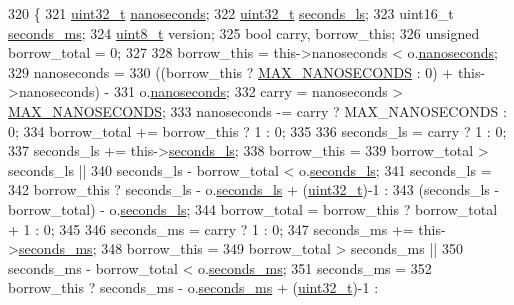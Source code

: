 \begin{DoxyCode}
320                                               \{
321         \hyperlink{parse_8c_a6eb1e68cc391dd753bc8ce896dbb8315}{uint32\_t} \hyperlink{class_timestamp_a78ae11d98fcfe738239d0a853d82c84a}{nanoseconds};
322         \hyperlink{parse_8c_a6eb1e68cc391dd753bc8ce896dbb8315}{uint32\_t} \hyperlink{class_timestamp_a2bf200e58cd268d8b86cf93c51500a44}{seconds\_ls};
323         uint16\_t \hyperlink{class_timestamp_a5d98378d782519e6f9c17db70f1620f0}{seconds\_ms};
324         \hyperlink{stdint_8h_aba7bc1797add20fe3efdf37ced1182c5}{uint8\_t} version;
325         \textcolor{keywordtype}{bool} carry, borrow\_this;
326         \textcolor{keywordtype}{unsigned} borrow\_total = 0;
327 
328         borrow\_this = this->nanoseconds < o.\hyperlink{class_timestamp_a78ae11d98fcfe738239d0a853d82c84a}{nanoseconds};
329         nanoseconds =
330             ((borrow\_this ? \hyperlink{ieee1588_8hpp_ad461a8bebfaea4b50a4e8cc7f73be797}{MAX\_NANOSECONDS} : 0) + this->nanoseconds) -
331             o.\hyperlink{class_timestamp_a78ae11d98fcfe738239d0a853d82c84a}{nanoseconds};
332         carry = nanoseconds > \hyperlink{ieee1588_8hpp_ad461a8bebfaea4b50a4e8cc7f73be797}{MAX\_NANOSECONDS};
333         nanoseconds -= carry ? MAX\_NANOSECONDS : 0;
334         borrow\_total += borrow\_this ? 1 : 0;
335 
336         seconds\_ls  = carry ? 1 : 0;
337         seconds\_ls += this->\hyperlink{class_timestamp_a2bf200e58cd268d8b86cf93c51500a44}{seconds\_ls};
338         borrow\_this =
339             borrow\_total > seconds\_ls ||
340             seconds\_ls - borrow\_total < o.\hyperlink{class_timestamp_a2bf200e58cd268d8b86cf93c51500a44}{seconds\_ls};
341         seconds\_ls  =
342             borrow\_this ? seconds\_ls - o.\hyperlink{class_timestamp_a2bf200e58cd268d8b86cf93c51500a44}{seconds\_ls} + (\hyperlink{parse_8c_a6eb1e68cc391dd753bc8ce896dbb8315}{uint32\_t})-1 :
343             (seconds\_ls - borrow\_total) - o.\hyperlink{class_timestamp_a2bf200e58cd268d8b86cf93c51500a44}{seconds\_ls};
344         borrow\_total = borrow\_this ? borrow\_total + 1 : 0;
345 
346         seconds\_ms  = carry ? 1 : 0;
347         seconds\_ms += this->\hyperlink{class_timestamp_a5d98378d782519e6f9c17db70f1620f0}{seconds\_ms};
348         borrow\_this =
349             borrow\_total > seconds\_ms ||
350             seconds\_ms - borrow\_total < o.\hyperlink{class_timestamp_a5d98378d782519e6f9c17db70f1620f0}{seconds\_ms};
351         seconds\_ms  =
352             borrow\_this ? seconds\_ms - o.\hyperlink{class_timestamp_a5d98378d782519e6f9c17db70f1620f0}{seconds\_ms} + (\hyperlink{parse_8c_a6eb1e68cc391dd753bc8ce896dbb8315}{uint32\_t})-1 :

\end{DoxyCode}
